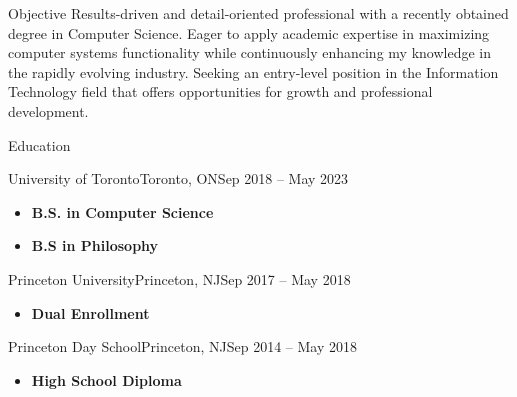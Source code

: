 \documentclass[]{mcdowellcv}
\begin{document}
	\makeheader
	

	\begin{cvsection}{Objective}
		Results-driven and detail-oriented professional with a recently obtained degree in Computer 
		Science. Eager to apply academic expertise in maximizing computer systems 
		functionality while continuously enhancing my knowledge in the rapidly evolving industry. Seeking an 
		entry-level position in the Information Technology field that offers opportunities for growth 
		and professional development.
	\end{cvsection}

	\begin{cvsection}{Education}
		\begin{cvsubsection}{University of Toronto}{Toronto, ON}{Sep 2018 -- May 2023}
			\begin{itemize}
				\item \textbf{B.S. in Computer Science}
				\item \textbf{B.S in Philosophy}
			\end{itemize}
		\end{cvsubsection}
		\begin{cvsubsection}{Princeton University}{Princeton, NJ}{Sep 2017 -- May 2018}
			\begin{itemize}
				\item \textbf{Dual Enrollment}
			\end{itemize}
		\end{cvsubsection}
            \begin{cvsubsection}{Princeton Day School}{Princeton, NJ}{Sep 2014 -- May 2018}
			\begin{itemize}
				\item \textbf{High School Diploma}
			\end{itemize}
		\end{cvsubsection}
	\end{cvsection}
\end{document}

